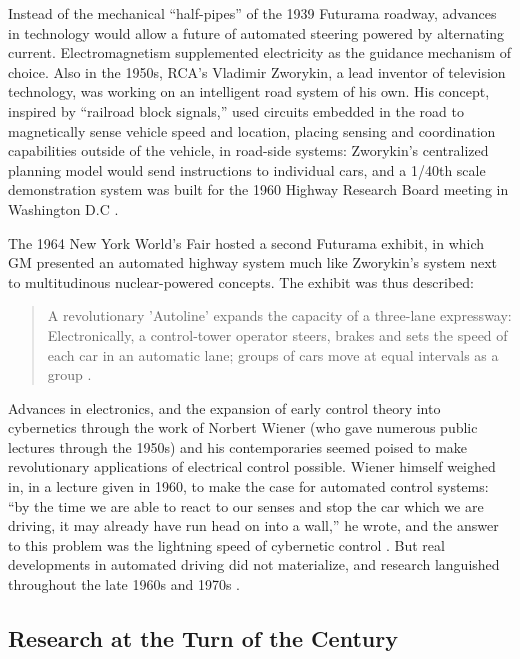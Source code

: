 Instead of the mechanical ``half-pipes'' of the 1939 Futurama roadway, advances in
technology would allow a future of automated steering powered
by alternating current. Electromagnetism supplemented electricity as the
guidance mechanism of choice. Also in the 1950s, RCA's
Vladimir Zworykin, a lead inventor of television technology, was
working on an intelligent road system of his own. His concept,
inspired by ``railroad block signals,'' used circuits embedded in the
road to magnetically sense vehicle speed and location, placing sensing
and coordination capabilities outside of the vehicle, in road-side
systems:  Zworykin's centralized planning model would send
instructions to individual cars, and a 1/40th scale demonstration
system was built for the 1960 Highway Research Board meeting in
Washington D.C \cite[p. 9]{wetmore}.

The 1964 New York World's Fair hosted a second Futurama exhibit, in
which GM presented an automated highway system much like Zworykin's
system next to multitudinous nuclear-powered concepts. The exhibit was
thus described: 
\begin{quote}
A revolutionary 'Autoline' expands the capacity of a three-lane
expressway: Electronically, a control-tower operator steers, brakes
and sets the speed of each car in an automatic lane; groups of cars
move at equal intervals as a group \cite[p. 9]{wetmore}.
\end{quote}
 Advances in
electronics, and the expansion of early control theory into
cybernetics through the work of Norbert Wiener (who gave numerous
public lectures through the 1950s) and his contemporaries seemed
poised to make revolutionary applications of electrical control
possible. Wiener himself weighed in, in a lecture given in 1960, to
make the case for automated control systems: ``by the time we are able
to react to our senses and stop the car which we are driving, it may
already have run head on into a wall,'' he wrote, and the answer to
this problem was the lightning speed of cybernetic control \cite{wienerOn}. But real
developments in automated driving did not materialize, and research
languished throughout the late 1960s and 1970s \cite[p. 10]{wetmore}.

\subsection{Research at the Turn of the Century}


